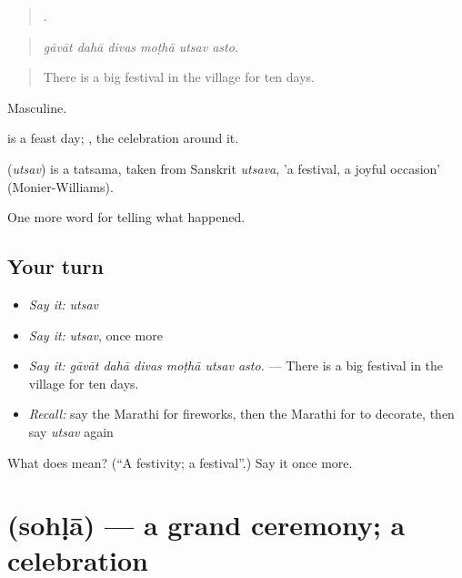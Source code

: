 \begin{quote}
     .
\end{quote}

\begin{quote}
\emph{gāvāt dahā divas moṭhā utsav asto.}
\end{quote}

\begin{quote}
There is a big festival in the village for ten days.
\end{quote}

Masculine.

 is a feast day; , the celebration around it.

\begin{cousinweb}
\textbf{} (\emph{utsav}) is a tatsama, taken from Sanskrit \emph{utsava}, 'a festival, a joyful occasion' (Monier-Williams).
\end{cousinweb}

\begin{grammarlens}[title={What you've built}]
One more word for telling what happened.
\end{grammarlens}

\subsection*{Your turn}
\begin{itemize}
\raggedright
  \item \emph{Say it:} \emph{utsav}
  \item \emph{Say it:} \emph{utsav}, once more
  \item \emph{Say it:} \emph{gāvāt dahā divas moṭhā utsav asto.} — There is a big festival in the village for ten days.
  \item \emph{Recall:} say the Marathi for fireworks, then the Marathi for to decorate, then say \emph{utsav} again
\end{itemize}

\begin{tcolorbox}[breakable,colback=teal!4,colframe=teal!35!black,title={Before you move on}]
What does  mean? (\textquotedblleft{}A festivity; a festival\textquotedblright{}.) Say it once more.
\end{tcolorbox}
\section[\texorpdfstring{\mr{सोहळा} (sohḷā)}{सोहळा (sohḷā)}]{ (sohḷā) — a grand ceremony; a celebration}

